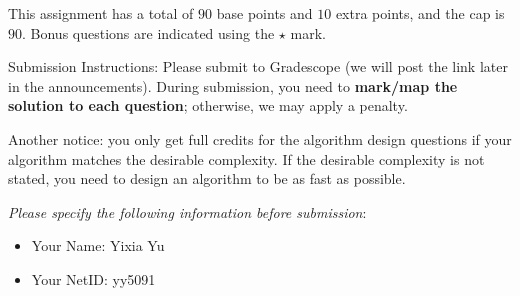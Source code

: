 \documentclass[letterpaper, 11pt]{article}
\newcommand{\1}{\mathds{1}}	%
\theoremstyle{definition}
\begin{document}
This assignment has a total of $90$ base points and $10$ extra points, and the cap is $90$.
Bonus questions are indicated using the $\star$ mark.

Submission Instructions: Please submit to Gradescope (we will post the link later in the announcements). During submission, you need to \textbf{mark/map the solution to each question}; otherwise, we may apply a penalty. 

Another notice: you only get full credits for the algorithm design questions if your algorithm matches the desirable complexity. If the desirable complexity is not stated, you need to design an algorithm to be as fast as possible.

\textit{Please specify the following information before submission}:
\begin{itemize}
    \item Your Name: Yixia Yu
    \item Your NetID: yy5091
\end{itemize}
\end{document}
